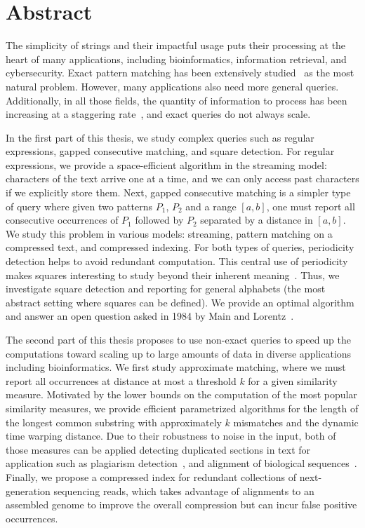 \chapter*{Abstract}

The simplicity of strings and their impactful usage puts their processing at the heart of many applications, including bioinformatics, information retrieval, and cybersecurity. Exact pattern matching has been extensively studied~\cite{charras2004handbook} as the most natural problem. However, many applications also need more general queries. Additionally, in all those fields, the quantity of information to process has been increasing at a staggering rate~\cite{muir2016real}, and exact queries do not always scale.

In the first part of this thesis, we study complex queries such as regular expressions, gapped consecutive matching, and square detection. 
For regular expressions, we provide a space-efficient algorithm in the streaming model: characters of the text arrive one at a time, and we can only access past characters if we explicitly store them. 
Next, gapped consecutive matching is a simpler type of query where given two patterns $P_1$, $P_2$ and a range $[a,b]$, one must report all consecutive occurrences of $P_1$ followed by $P_2$ separated by a distance in $[a,b]$. We study this problem in various models: streaming, pattern matching on a compressed text, and compressed indexing.
For both types of queries, periodicity detection helps to avoid redundant computation. This central use of periodicity makes squares interesting to study beyond their inherent meaning~\cite{Kolpakov2003}. Thus, we investigate square detection and reporting for general alphabets (the most abstract setting where squares can be defined). We provide an optimal algorithm and answer an open question asked in 1984 by Main and Lorentz~\cite{Main1984}.

The second part of this thesis proposes to use non-exact queries to speed up the computations toward scaling up to large amounts of data in diverse applications including bioinformatics.
We first study approximate matching, where we must report all occurrences at distance at most a threshold $k$ for a given similarity measure. Motivated by the lower bounds on the computation of the most popular similarity measures, we provide efficient parametrized algorithms for the length of the longest common substring with approximately $k$ mismatches and the dynamic time warping distance.
Due to their robustness to noise in the input, both of those measures can be applied detecting duplicated sections in text for application such as plagiarism detection~\cite{zou2010cluster}, and alignment of biological sequences~\cite{leimeister2014kmacs,loose2016real,han2018accurate}.
Finally, we propose a compressed index for redundant collections of next-generation sequencing reads, which takes advantage of alignments to an assembled genome to improve the overall compression but can incur false positive occurrences.

